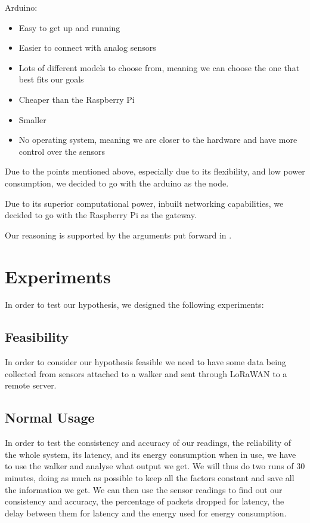 	Arduino:
	\begin{itemize}
		\item Easy to get up and running
		\item Easier to connect with analog sensors
		\item Lots of different models to choose from, meaning we can choose the one that best fits our goals
		\item Cheaper than the Raspberry Pi
		\item Smaller 
		\item No operating system, meaning we are closer to the hardware and have more control over the sensors
	\end{itemize}

	Due to the points mentioned above, especially due to its flexibility, and low power consumption, we decided to go with the arduino as the node.

	Due to its superior computational power, inbuilt networking capabilities, we decided to go with the Raspberry Pi as the gateway.

	Our reasoning is supported by the arguments put forward in \cite{postolache2011smart}.



\section{Experiments}
In order to test our hypothesis, we designed the following experiments:

	\subsection{Feasibility}
		In order to consider our hypothesis feasible we need to have some data being collected from sensors attached to a walker and sent through LoRaWAN to a remote server.

	\subsection{Normal Usage}
		In order to test the consistency and accuracy of our readings, the reliability of the whole system, its latency, and its energy consumption when in use, we have to use the walker and analyse what output we get. We will thus do two runs of 30 minutes, doing as much as possible to keep all the factors constant and save all the information we get. We can then use the sensor readings to find out our consistency and accuracy, the percentage of packets dropped for latency, the delay between them for latency and the energy used for energy consumption.

